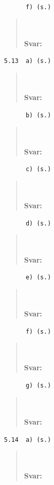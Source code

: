 \documentclass[a4paper]{article}
\newcommand{\tskcol}[1]{\textcolor{tskcol}{#1}}
\begin{document}
	\texttt{\tskcol{~~~~~~f) (s.)}}
	\begin{quotation}
		\noindent
		\\ \\
		\textbf{Svar:}
	\end{quotation}
	
	\texttt{\tskcol{5.13~~a) (s.)}}
	\begin{quotation}
		\noindent
		\\ \\
		\textbf{Svar:}
	\end{quotation}
	
	\texttt{\tskcol{~~~~~~b) (s.)}}
	\begin{quotation}
		\noindent
		\\ \\
		\textbf{Svar:}
	\end{quotation}
	
	\texttt{\tskcol{~~~~~~c) (s.)}}
	\begin{quotation}
		\noindent
		\\ \\
		\textbf{Svar:}
	\end{quotation}
	
	\texttt{\tskcol{~~~~~~d) (s.)}}
	\begin{quotation}
		\noindent
		\\ \\
		\textbf{Svar:}
	\end{quotation}
	
	\texttt{\tskcol{~~~~~~e) (s.)}}
	\begin{quotation}
		\noindent
		\\ \\
		\textbf{Svar:}
	\end{quotation}
	
	\texttt{\tskcol{~~~~~~f) (s.)}}
	\begin{quotation}
		\noindent
		\\ \\
		\textbf{Svar:}
	\end{quotation}
	
	\texttt{\tskcol{~~~~~~g) (s.)}}
	\begin{quotation}
		\noindent
		\\ \\
		\textbf{Svar:}
	\end{quotation}
	
	\texttt{\tskcol{5.14~~a) (s.)}}
	\begin{quotation}
		\noindent
		\\ \\
		\textbf{Svar:}
	\end{quotation}
	
\end{document}
